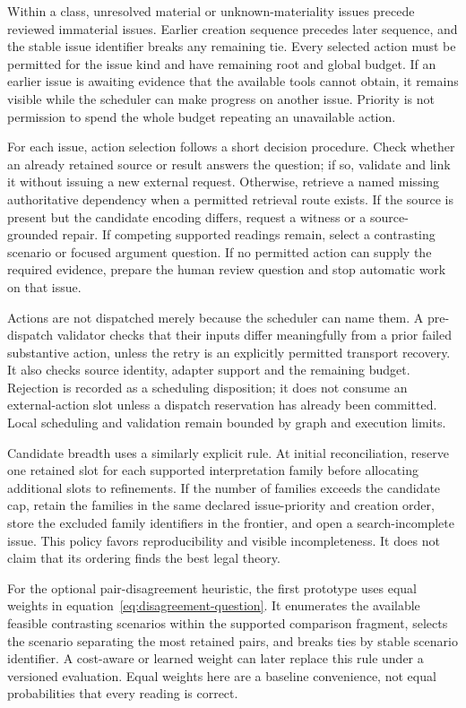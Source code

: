 Within a class, unresolved material or unknown-materiality issues precede reviewed
immaterial issues. Earlier creation sequence precedes later sequence, and the
stable issue identifier breaks any remaining tie. Every selected action must be
permitted for the issue kind and have remaining root and global budget. If an
earlier issue is awaiting evidence that the available tools cannot obtain, it
remains visible while the scheduler can make progress on another issue. Priority
is not permission to spend the whole budget repeating an unavailable action.

For each issue, action selection follows a short decision procedure. Check whether
an already retained source or result answers the question; if so, validate and
link it without issuing a new external request. Otherwise, retrieve a named
missing authoritative dependency when a permitted retrieval route exists. If the
source is present but the candidate encoding differs, request a witness or a
source-grounded repair. If competing supported readings remain, select a
contrasting scenario or focused argument question. If no permitted action can
supply the required evidence, prepare the human review question and stop automatic
work on that issue.

Actions are not dispatched merely because the scheduler can name them. A
pre-dispatch validator checks that their inputs differ meaningfully from a prior
failed substantive action, unless the retry is an explicitly permitted transport
recovery. It also checks source identity, adapter support and the remaining
budget. Rejection is recorded as a scheduling disposition; it does not consume
an external-action slot unless a dispatch reservation has already been committed.
Local scheduling and validation remain bounded by graph and execution limits.

Candidate breadth uses a similarly explicit rule. At initial reconciliation,
reserve one retained slot for each supported interpretation family before
allocating additional slots to refinements. If the number of families exceeds the
candidate cap, retain the families in the same declared issue-priority and
creation order, store the excluded family identifiers in the frontier, and open
a search-incomplete issue. This policy favors reproducibility and visible
incompleteness. It does not claim that its ordering finds the best legal theory.

For the optional pair-disagreement heuristic, the first prototype uses equal
weights in equation~\eqref{eq:disagreement-question}. It enumerates the available
feasible contrasting scenarios within the supported comparison fragment, selects
the scenario separating the most retained pairs, and breaks ties by stable
scenario identifier. A cost-aware or learned weight can later replace this rule
under a versioned evaluation. Equal weights here are a baseline convenience,
not equal probabilities that every reading is correct.

